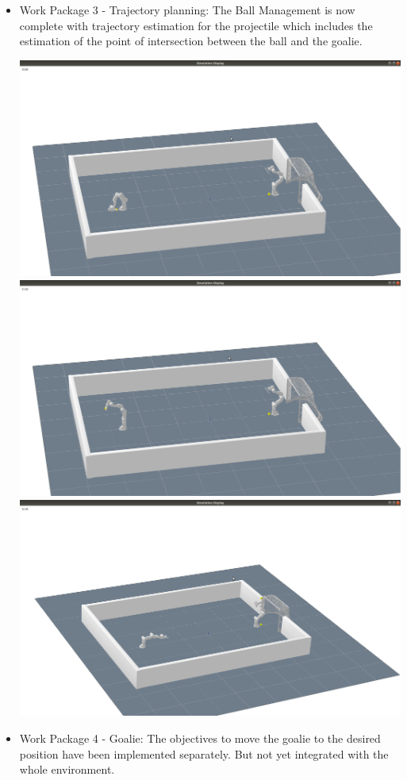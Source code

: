\documentclass[12pt,pdftex,a4paper]{article}
\begin{document}
\begin{itemize}
\item
Work Package 3 - Trajectory planning:
The Ball Management is now complete with trajectory estimation for the projectile which includes the estimation of the point of intersection between the ball and the goalie.
\\
\begin{enumerate}
    \begin{minipage}{\linewidth}
        \centering
        \includegraphics[width=.6\textwidth]{throw1.png}
        \captionof{\\}
        \includegraphics[width=.6\textwidth]{throw2.png}
        \captionof{\\}
        \includegraphics[width=.6\textwidth]{trajectory.png}
    \end{minipage}
\end{enumerate}

\item
Work Package 4 - Goalie:
The objectives to move the goalie to the desired position have been implemented separately. But not yet integrated with the whole environment.
\end{itemize}
\end{document}
